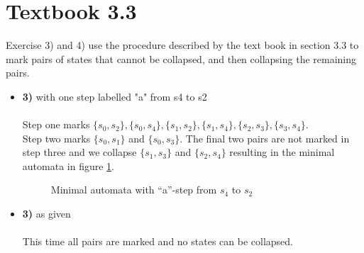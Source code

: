 \documentclass[defaultpackages]{simplereport}
\begin{document}
\section*{Textbook 3.3}
  Exercise 3) and 4) use the procedure described by the text book in section 3.3
  to mark pairs of states that cannot be collapsed, and then collapsing the
  remaining pairs.
\begin{itemize}[label=]
\item \textbf{3)} with one step labelled "a" from s4 to s2\\\\
  Step one marks $\{s_0, s_2\}, \{s_0, s_4\}, \{s_1, s_2\}, \{s_1, s_4\}, \{s_2,
  s_3\}, \{s_3, s_4\}$.\\
  Step two marks $\{s_0, s_1\}$ and $\{s_0, s_3\}$. The final two pairs are not
  marked in step three and we collapse $\{s_1, s_3\}$ and $\{s_2, s_4\}$
  resulting in the minimal automata in figure \ref{fig:3.3.3a}.
  \begin{figure}[H]
     \centering
     \caption{Minimal automata with ``a''-step from $s_4$ to $s_2$}
     \label{fig:3.3.3a}
  \end{figure}
\item \textbf{3)} as given\\\\
  This time all pairs are marked and no states can be collapsed.
  \begin{figure}[H]
     \centering
\end{figure}
\end{itemize}
\end{document}
